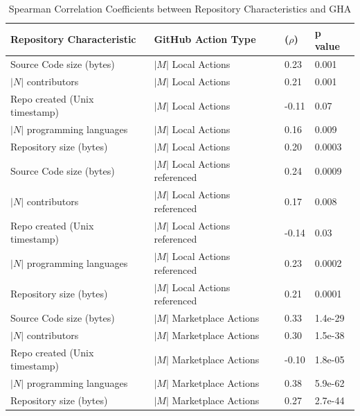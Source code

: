 \documentclass[conference]{IEEEtran}
\begin{document}
      \begin{table}[h]
          \centering
          \caption{Spearman Correlation Coefficients between Repository Characteristics and GHA}
          \label{tab:correlation_results}
          \setlength{\oddsidemargin}{-2in} %
          \begin{tabular}{|l|l|l|l|}
            \hline
            \textbf{Repository Characteristic} & \textbf{GitHub Action Type} & \textbf{(\(\rho\))} & \textbf{p value} \\
            \hline
            Source Code size (bytes) & $|M|$ Local Actions & 0.23 & 0.001 \\
            \hline
            $|N|$ contributors & $|M|$ Local Actions & 0.21 & 0.001 \\
            \hline
            Repo created (Unix timestamp) & $|M|$ Local Actions & -0.11 & 0.07 \\
            \hline
            $|N|$ programming languages & $|M|$ Local Actions & 0.16 & 0.009 \\
            \hline
            Repository size (bytes) & $|M|$ Local Actions & 0.20 & 0.0003 \\
            \hline
            Source Code size (bytes) & $|M|$ Local Actions referenced & 0.24 & 0.0009 \\
            \hline
            $|N|$ contributors & $|M|$ Local Actions referenced & 0.17 & 0.008 \\
            \hline
            Repo created (Unix timestamp) & $|M|$ Local Actions referenced & -0.14 & 0.03 \\
            \hline
            $|N|$ programming languages & $|M|$ Local Actions referenced & 0.23 & 0.0002 \\
            \hline
            Repository size (bytes) & $|M|$ Local Actions referenced & 0.21 & 0.0001 \\
            \hline
            Source Code size (bytes) & $|M|$ Marketplace Actions & 0.33 & 1.4e-29 \\
            \hline
            $|N|$ contributors & $|M|$ Marketplace Actions & 0.30 & 1.5e-38 \\
            \hline
            Repo created (Unix timestamp) & $|M|$ Marketplace Actions & -0.10 & 1.8e-05 \\
            \hline
            $|N|$ programming languages & $|M|$ Marketplace Actions & 0.38 & 5.9e-62 \\
            \hline
            Repository size (bytes) & $|M|$ Marketplace Actions & 0.27 & 2.7e-44 \\

\end{tabular}
\end{table}
\end{document}
